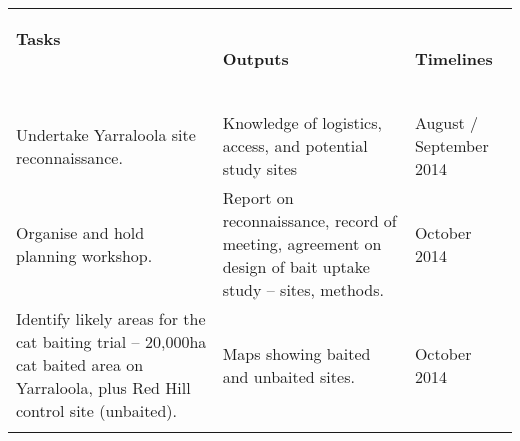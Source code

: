 \documentclass[version=last,
    paper=a4,                               %
    10pt,                                   %
    dvipsnames,
    oneside,                              %
    headings=openany,                       %
    open=any,
    BCOR=7mm,                               %
    DIV=15,     %
]{scrbook}
\begin{document}
\begin{longtable}[]{@{}lll@{}}
\toprule
\endhead
\begin{minipage}[t]{0.30\columnwidth}\raggedright
\textbf{Tasks}

\textbf{~}\strut
\end{minipage} & \begin{minipage}[t]{0.30\columnwidth}\raggedright
\textbf{Outputs}\strut
\end{minipage} & \begin{minipage}[t]{0.30\columnwidth}\raggedright
\textbf{Timelines}\strut
\end{minipage}\tabularnewline
\begin{minipage}[t]{0.30\columnwidth}\raggedright
Undertake Yarraloola site reconnaissance.\strut
\end{minipage} & \begin{minipage}[t]{0.30\columnwidth}\raggedright
Knowledge of logistics, access, and potential study sites\strut
\end{minipage} & \begin{minipage}[t]{0.30\columnwidth}\raggedright
August / September 2014\strut
\end{minipage}\tabularnewline
\begin{minipage}[t]{0.30\columnwidth}\raggedright
Organise and hold planning workshop.\strut
\end{minipage} & \begin{minipage}[t]{0.30\columnwidth}\raggedright
Report on reconnaissance, record of meeting, agreement on design of bait
uptake study -- sites, methods.\strut
\end{minipage} & \begin{minipage}[t]{0.30\columnwidth}\raggedright
October 2014\strut
\end{minipage}\tabularnewline
\begin{minipage}[t]{0.30\columnwidth}\raggedright
Identify likely areas for the cat baiting trial -- 20,000ha cat baited
area on Yarraloola, plus Red Hill control site (unbaited).\strut
\end{minipage} & \begin{minipage}[t]{0.30\columnwidth}\raggedright
Maps showing baited and unbaited sites.\strut
\end{minipage} & \begin{minipage}[t]{0.30\columnwidth}\raggedright
October 2014\strut
\end{minipage}\tabularnewline
\begin{minipage}[t]{0.30\columnwidth}\raggedright

\end{minipage}
\end{longtable}
\end{document}
